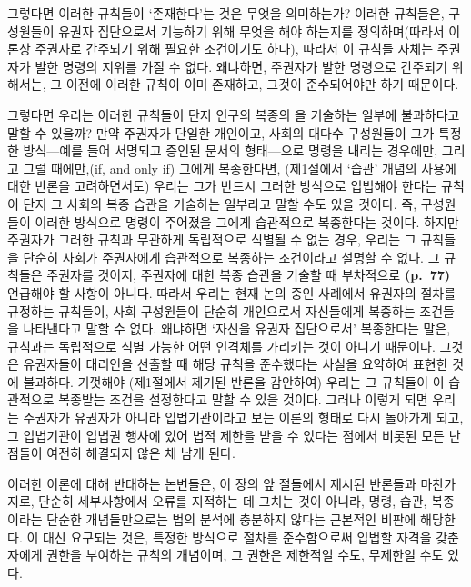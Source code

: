 그렇다면 이러한 규칙들이 `존재한다'는 것은 무엇을 의미하는가? 이러한
규칙들은, 구성원들이 유권자 집단으로서 기능하기 위해 무엇을 해야
하는지를 정의하며(따라서 이론상 주권자로 간주되기 위해 필요한 조건이기도
하다), 따라서 이 규칙들 자체는 주권자가 발한 명령의 지위를 가질 수 없다.
왜냐하면, 주권자가 발한 명령으로 간주되기 위해서는, 그 이전에 이러한
규칙이 이미 존재하고, 그것이 준수되어야만 하기 때문이다.

그렇다면 우리는 이러한 규칙들이 단지 인구의 복종의 을
기술하는 일부에 불과하다고 말할 수 있을까? 만약 주권자가 단일한
개인이고, 사회의 대다수 구성원들이 그가 특정한 방식---예를 들어 서명되고
증인된 문서의 형태---으로 명령을 내리는 경우에만, 그리고 그럴
때에만,(if, and only if) 그에게 복종한다면, (제1절에서 `습관' 개념의
사용에 대한 반론을 고려하면서도) 우리는 그가 반드시 그러한 방식으로
입법해야 한다는 규칙이 단지 그 사회의 복종 습관을 기술하는 일부라고 말할
수도 있을 것이다. 즉, 구성원들이 이러한 방식으로 명령이 주어졌을
 그에게 습관적으로 복종한다는 것이다. 하지만 주권자가
그러한 규칙과 무관하게 독립적으로 식별될 수 없는 경우, 우리는 그
규칙들을 단순히 사회가 주권자에게 습관적으로 복종하는 조건이라고 설명할
수 없다. 그 규칙들은 주권자를  것이지,
주권자에 대한 복종 습관을 기술할 때 부차적으로 \textbf{(p.~77)} 언급해야
할 사항이 아니다. 따라서 우리는 현재 논의 중인 사례에서 유권자의 절차를
규정하는 규칙들이, 사회 구성원들이 단순히 개인으로서 자신들에게 복종하는
조건들을 나타낸다고 말할 수 없다. 왜냐하면 `자신을 유권자 집단으로서'
복종한다는 말은, 규칙과는 독립적으로 식별 가능한 어떤 인격체를 가리키는
것이 아니기 때문이다. 그것은 유권자들이 대리인을 선출할 때 해당 규칙을
준수했다는 사실을 요약하여 표현한 것에 불과하다. 기껏해야 (제1절에서
제기된 반론을 감안하여) 우리는 그 규칙들이 이 습관적으로 복종받는 조건을 설정한다고 말할 수 있을 것이다.
그러나 이렇게 되면 우리는 주권자가 유권자가 아니라 입법기관이라고 보는
이론의 형태로 다시 돌아가게 되고, 그 입법기관이 입법권 행사에 있어 법적
제한을 받을 수 있다는 점에서 비롯된 모든 난점들이 여전히 해결되지 않은
채 남게 된다.

이러한 이론에 대해 반대하는 논변들은, 이 장의 앞 절들에서 제시된
반론들과 마찬가지로, 단순히 세부사항에서 오류를 지적하는 데 그치는 것이
아니라, 명령, 습관, 복종이라는 단순한 개념들만으로는 법의 분석에
충분하지 않다는 근본적인 비판에 해당한다. 이 대신 요구되는 것은, 특정한
방식으로 절차를 준수함으로써 입법할 자격을 갖춘 자에게 권한을 부여하는
규칙의 개념이며, 그 권한은 제한적일 수도, 무제한일 수도 있다.

